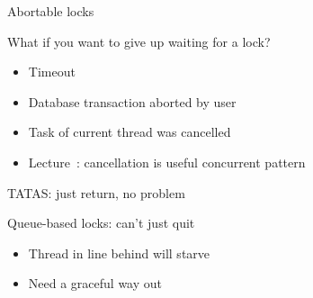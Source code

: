 \begin{frame}{Abortable locks}

What if you want to give up waiting for a lock?
\begin{itemize}
  \item Timeout
  \item Database transaction aborted by user
  \item Task of current thread was cancelled
  \pause \item Lecture~\patternsNum: cancellation is useful concurrent pattern
\end{itemize}

\pause
TATAS: just return, no problem

\pause
Queue-based locks: can’t just quit
\begin{itemize}
  \item Thread in line behind will starve
  \item Need a graceful way out
\end{itemize}
\end{frame}


